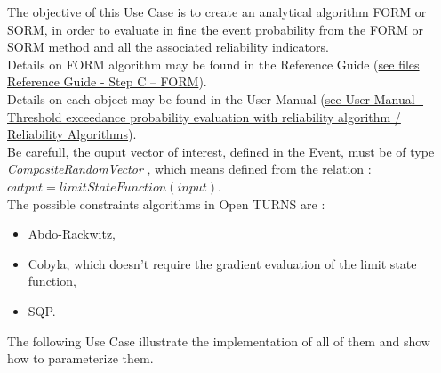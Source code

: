 \renewcommand{\filename}{docUC_ThresholdExceedance_FORMAlgorithm.tex}
\renewcommand{\filetitle}{UC : Creation of an analytical algorithm : FORM/SORM}

\HeaderIIILevel

\label{analyticalRes}



The objective of this Use Case is to create an analytical algorithm FORM or SORM, in order to evaluate in fine the event probability from the FORM or SORM  method and all the associated reliability indicators.\\




Details on FORM algorithm may be found in the Reference Guide (\href{OpenTURNS_ReferenceGuide.pdf}{see files Reference Guide - Step C -- FORM}).\\


Details on each object may be found in the User Manual  (\href{OpenTURNS_UserManual_TUI.pdf}{see User Manual - Threshold exceedance probability evaluation with reliability algorithm / Reliability Algorithms}).\\



Be carefull, the ouput vector of interest, defined in the Event, must be of type {\itshape CompositeRandomVector }, which means defined from the relation : $output = limitStateFunction(input)$.\\

The possible constraints algorithms  in Open TURNS are :
\begin{itemize}
\item Abdo-Rackwitz,
\item Cobyla, which doesn't require the gradient evaluation of the limit state function,
\item SQP.
\end{itemize}
The following Use Case illustrate the implementation of all of them and show how to parameterize them.\\

